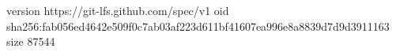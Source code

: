 version https://git-lfs.github.com/spec/v1
oid sha256:fab056ed4642e509f0c7ab03af223d611bf41607ea996e8a8839d7d9d3911163
size 87544
